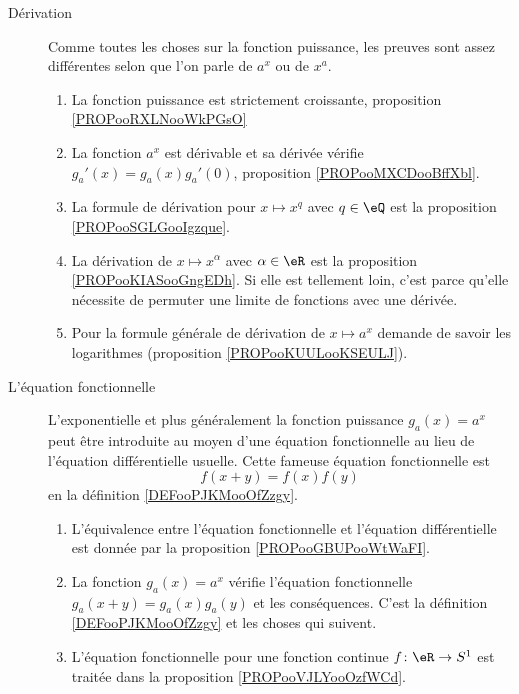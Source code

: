 \begin{description}
\item[Dérivation]
    Comme toutes les choses sur la fonction puissance, les preuves sont assez différentes selon que l'on parle de \( a^x\) ou de \( x^a\).
\begin{enumerate}
    \item
        La fonction puissance est strictement croissante, proposition \ref{PROPooRXLNooWkPGsO}
    \item
        La fonction \( a^x\) est dérivable et sa dérivée vérifie \( g_a'(x)=g_a(x)g_a'(0)\), proposition \ref{PROPooMXCDooBffXbl}.
    \item
        La formule de dérivation pour \( x\mapsto x^q\) avec \( q\in \eQ\) est la proposition \ref{PROPooSGLGooIgzque}. 
    \item
        La dérivation de \( x\mapsto x^{\alpha}\) avec \( \alpha\in \eR\) est la proposition \ref{PROPooKIASooGngEDh}. Si elle est tellement loin, c'est parce qu'elle nécessite de permuter une limite de fonctions avec une dérivée.
    \item
        Pour la formule générale de dérivation de \( x\mapsto a^x\) demande de savoir les logarithmes (proposition \ref{PROPooKUULooKSEULJ}).
\end{enumerate}

\item[L'équation fonctionnelle]
    L'exponentielle et plus généralement la fonction puissance \( g_a(x)=a^x\) peut être introduite au moyen d'une équation fonctionnelle au lieu de l'équation différentielle usuelle. Cette fameuse équation fonctionnelle est
    \begin{equation}
        f(x+y)=f(x)f(y)
    \end{equation}
    en la définition \ref{DEFooPJKMooOfZzgy}.
\begin{enumerate}
    \item
        L'équivalence entre l'équation fonctionnelle et l'équation différentielle est donnée par la proposition \ref{PROPooGBUPooWtWaFI}.
    \item
        La fonction \( g_a(x)=a^x\) vérifie l'équation fonctionnelle \( g_a(x+y)=g_a(x)g_a(y)\) et les conséquences. C'est la définition \ref{DEFooPJKMooOfZzgy} et les choses qui suivent.
    \item
        L'équation fonctionnelle pour une fonction continue \( f\colon \eR\to S^1\) est traitée dans la proposition \ref{PROPooVJLYooOzfWCd}.
\end{enumerate}
\end{description}

